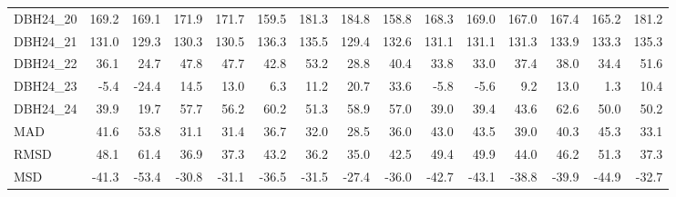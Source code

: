 \begin{longtable}{lrrrrrrrrrrrrrr}
DBH24\_20 & 169.2 & 169.1 & 171.9 & 171.7 & 159.5 & 181.3 & 184.8 & 158.8 & 168.3 & 169.0 & 167.0 & 167.4 & 165.2 & 181.2 \\
DBH24\_21 & 131.0 & 129.3 & 130.3 & 130.5 & 136.3 & 135.5 & 129.4 & 132.6 & 131.1 & 131.1 & 131.3 & 133.9 & 133.3 & 135.3 \\
DBH24\_22 & 36.1 & 24.7 & 47.8 & 47.7 & 42.8 & 53.2 & 28.8 & 40.4 & 33.8 & 33.0 & 37.4 & 38.0 & 34.4 & 51.6 \\
DBH24\_23 & -5.4 & -24.4 & 14.5 & 13.0 & 6.3 & 11.2 & 20.7 & 33.6 & -5.8 & -5.6 & 9.2 & 13.0 & 1.3 & 10.4 \\
DBH24\_24 & 39.9 & 19.7 & 57.7 & 56.2 & 60.2 & 51.3 & 58.9 & 57.0 & 39.0 & 39.4 & 43.6 & 62.6 & 50.0 & 50.2 \\
MAD & 41.6 & 53.8 & 31.1 & 31.4 & 36.7 & 32.0 & 28.5 & 36.0 & 43.0 & 43.5 & 39.0 & 40.3 & 45.3 & 33.1 \\
RMSD & 48.1 & 61.4 & 36.9 & 37.3 & 43.2 & 36.2 & 35.0 & 42.5 & 49.4 & 49.9 & 44.0 & 46.2 & 51.3 & 37.3 \\
MSD & -41.3 & -53.4 & -30.8 & -31.1 & -36.5 & -31.5 & -27.4 & -36.0 & -42.7 & -43.1 & -38.8 & -39.9 & -44.9 & -32.7 \\
\bottomrule
\end{longtable}